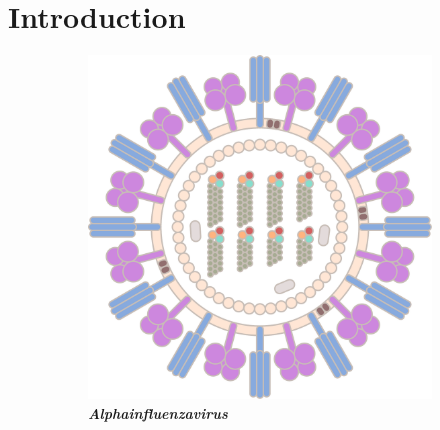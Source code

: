 \chapter{Introduction} \label{chap:1}

\begin{figure}
    \begin{adjustbox}{minipage=\dimexpr{}\fboxrule,fbox}
        \begin{subfigure}[b]{0.475\textwidth}
            \includegraphics[width=\textwidth]{Extra_Graphics/Influenza_A.pdf}
            \caption[\textit{Alphainfluenzavirus}]{\textbf{\textit{Alphainfluenzavirus}}}
            \label{fig:1.0.1a}
        \end{subfigure}
        \hfill
        \begin{subfigure}[b]{0.475\textwidth}

\end{subfigure}
\end{adjustbox}
\end{figure}
